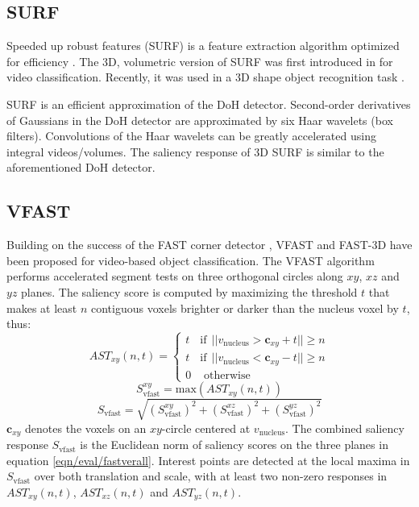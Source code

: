 \subsection{SURF}
Speeded up robust features (SURF) is a feature extraction algorithm optimized for efficiency \cite{Bay2008}. The 3D, volumetric version of SURF was first introduced in \cite{Willems2008} for video classification. Recently, it was used in a 3D shape object recognition task \cite{Knopp2010}.

SURF is an efficient approximation of the DoH detector. Second-order derivatives of Gaussians in the DoH detector are approximated by six Haar wavelets (\ie box filters). Convolutions of the Haar wavelets can be greatly accelerated using integral videos/volumes. The saliency response of 3D SURF is similar to the aforementioned DoH detector. 

\subsection{VFAST}

Building on the success of the FAST corner detector \cite{Rosten2010}, VFAST \cite{Yu2010} and FAST-3D \cite{Koelstra2009} have been proposed for video-based object classification. The VFAST algorithm performs accelerated segment tests on three orthogonal circles along $xy$, $xz$ and $yz$ planes. The saliency score is computed by maximizing the threshold $t$ that makes at least $n$ contiguous voxels brighter or darker than the nucleus voxel by $t$, thus: 
\begin{equation}
AST_{xy}(n,t) = \left\{
\begin{array}{lc}
t & \textrm{if}~~||v_\textrm{nucleus} > \mathbf{c}_{xy} + t || \ge n \\
t & \textrm{if}~~||v_\textrm{nucleus} < \mathbf{c}_{xy} - t || \ge n \\
0 & \mbox{ otherwise }
\end{array}
\right.
\label{eqn/eval/fastast}
\end{equation}
\begin{equation}
S^{xy}_\textrm{vfast} = \mathrm{max}(AST_{xy}(n,t))
\label{eq/eval/fast}
\end{equation}
\begin{equation}
S_\textrm{vfast} = \sqrt{(S^{xy}_\textrm{vfast})^2+(S^{xz}_\textrm{vfast})^2+(S^{yz}_\textrm{vfast})^2}
\label{eqn/eval/fastverall}
\end{equation}
$\mathbf{c}_{xy}$ denotes the voxels on an $xy$-circle centered at $v_\textrm{nucleus}$. The combined saliency response $S_{\textrm{vfast}}$ is the Euclidean norm of saliency scores on the three planes in equation \ref{eqn/eval/fastverall}. Interest points are detected at the local maxima in $S_{\textrm{vfast}}$ over both translation and scale, with at least two non-zero responses in $AST_{xy}(n,t)$, $AST_{xz}(n,t)$ and $AST_{yz}(n,t)$.


